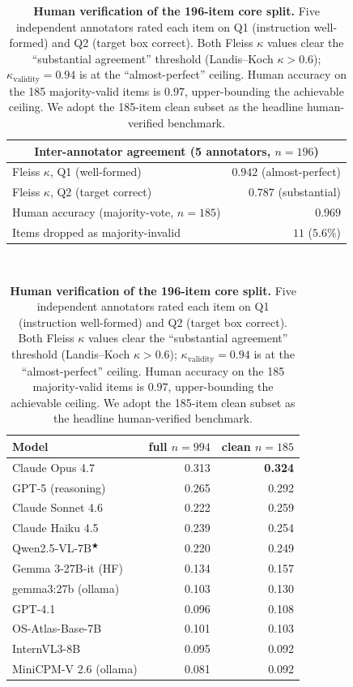 \begin{table}[t]
\centering
\small
\begin{threeparttable}
\caption{\textbf{Human verification of the 196-item core split.} Five
independent annotators rated each item on Q1 (instruction well-formed)
and Q2 (target box correct). Both Fleiss $\kappa$ values clear the
``substantial agreement'' threshold (Landis--Koch $\kappa{>}0.6$);
$\kappa_{\mathrm{validity}}{=}0.94$ is at the ``almost-perfect''
ceiling. Human accuracy on the 185 majority-valid items is $0.97$,
upper-bounding the achievable ceiling. We adopt the 185-item clean
subset as the headline human-verified benchmark.}
\label{tab:kappa-and-clean}
\begin{tabular}{@{}lr@{}}
\toprule
\multicolumn{2}{c}{\textbf{Inter-annotator agreement (5 annotators, $n{=}196$)}}\\
\midrule
Fleiss $\kappa$, Q1 (well-formed)       & $\mathbf{0.942}$ (almost-perfect) \\
Fleiss $\kappa$, Q2 (target correct)    & $\mathbf{0.787}$ (substantial) \\
Human accuracy (majority-vote, $n{=}185$) & $\mathbf{0.969}$ \\
Items dropped as majority-invalid       & $11$ ($5.6\%$) \\
\bottomrule
\end{tabular}
\\[6pt]
\begin{tabular}{@{}lrr@{}}
\toprule
\textbf{Model} & \textbf{full $n{=}994$} & \textbf{clean $n{=}185$} \\
\midrule
Claude Opus 4.7                & 0.313 & \textbf{0.324} \\
GPT-5 (reasoning)              & 0.265 & 0.292 \\
Claude Sonnet 4.6              & 0.222 & 0.259 \\
Claude Haiku 4.5               & 0.239 & 0.254 \\
Qwen2.5-VL-7B$^{\bigstar}$     & 0.220 & 0.249 \\
Gemma 3-27B-it (HF)            & 0.134 & 0.157 \\
gemma3:27b (ollama)            & 0.103 & 0.130 \\
GPT-4.1                        & 0.096 & 0.108 \\
OS-Atlas-Base-7B               & 0.101 & 0.103 \\
InternVL3-8B                   & 0.095 & 0.092 \\
MiniCPM-V 2.6 (ollama)         & 0.081 & 0.092 \\

\end{tabular}
\end{threeparttable}
\end{table}
